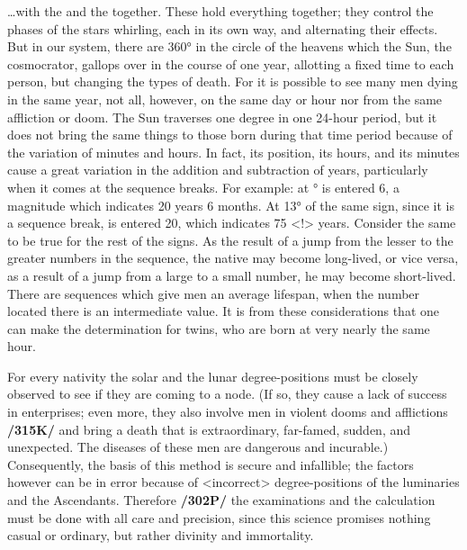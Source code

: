 …with the \Sun\xspace and the \Moon\xspace together. These hold everything together; they control the phases of the stars whirling, each in its own way, and alternating their effects. But in our system, there are 360° in the circle of the heavens which the Sun, the cosmocrator, gallops over in the course of one year, allotting a fixed
time to each person, but changing the types of death. For it is possible to see many men dying in the same year, not all, however, on the same day or hour nor from the same affliction or doom. The Sun traverses one degree in one 24-hour period, but it does not bring the same things to those born during that time period because of the variation of minutes and hours. In fact, its position, its hours, and its minutes cause a great variation in the addition and subtraction of years, particularly when it comes at the sequence breaks. For example: at \Leo\xspace 12° is entered 6, a magnitude which indicates 20 years 6 months. At 13° of the same sign, since it is a sequence break, is entered 20, which indicates 75 <!> years. Consider the same to be true for the rest of the signs. As the result of a jump from the lesser to the greater numbers in the sequence, the native may become long-lived, or vice versa, as a result of a jump from a large to a small number, he may become short-lived. There are sequences which give men an average lifespan, when the number located there is an intermediate value. It is from these considerations that one can make the determination for twins, who are born at very nearly the same hour.

For every nativity the solar and the lunar degree-positions must be closely observed to see if they are coming to a node. (If so, they cause a lack of success in enterprises; even more, they also involve men in violent dooms and afflictions \textbf{/315K/} and bring a death that is extraordinary, far-famed, sudden, and unexpected. The diseases of these men are dangerous and incurable.) Consequently, the basis of this method is secure and infallible; the factors however can be in error because of <incorrect> degree-positions of the luminaries and the Ascendants. Therefore \textbf{/302P/} the examinations and the calculation must be done with all care and precision, since this science promises nothing casual or ordinary, but rather divinity and immortality.

